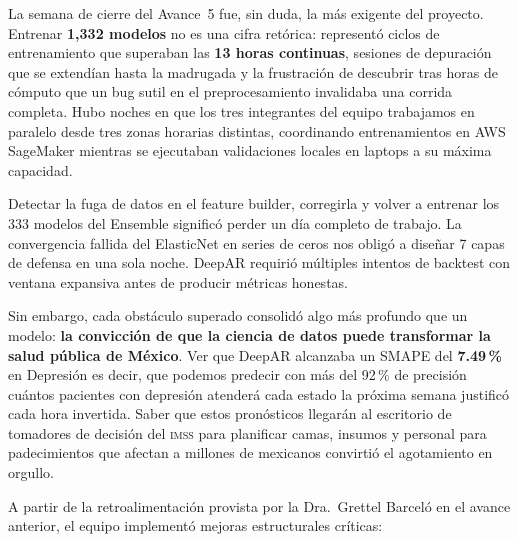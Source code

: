 \documentclass[12pt, letterpaper]{article}
\newcommand{\imss}{\textsc{imss}}
\begin{document}
\begin{insightbox}
La semana de cierre del Avance~5 fue, sin duda, la más exigente del proyecto. Entrenar \textbf{1,332 modelos} no es una cifra retórica: representó ciclos de entrenamiento que superaban las \textbf{13 horas continuas}, sesiones de depuración que se extendían hasta la madrugada y la frustración de descubrir tras horas de cómputo que un bug sutil en el preprocesamiento invalidaba una corrida completa. Hubo noches en que los tres integrantes del equipo trabajamos en paralelo desde tres zonas horarias distintas, coordinando entrenamientos en AWS SageMaker mientras se ejecutaban validaciones locales en laptops a su máxima capacidad.

Detectar la fuga de datos en el feature builder, corregirla y volver a entrenar los 333 modelos del Ensemble significó perder un día completo de trabajo. La convergencia fallida del ElasticNet en series de ceros nos obligó a diseñar 7 capas de defensa en una sola noche. DeepAR requirió múltiples intentos de backtest con ventana expansiva antes de producir métricas honestas.

Sin embargo, cada obstáculo superado consolidó algo más profundo que un modelo: \textbf{la convicción de que la ciencia de datos puede transformar la salud pública de México}. Ver que DeepAR alcanzaba un SMAPE del \textbf{7.49\,\%} en Depresión es decir, que podemos predecir con más del 92\,\% de precisión cuántos pacientes con depresión atenderá cada estado la próxima semana justificó cada hora invertida. Saber que estos pronósticos llegarán al escritorio de tomadores de decisión del \imss{} para planificar camas, insumos y personal para padecimientos que afectan a millones de mexicanos convirtió el agotamiento en orgullo.
\end{insightbox}

A partir de la retroalimentación provista por la Dra.\ Grettel Barceló en el avance anterior, el equipo implementó mejoras estructurales críticas:
\end{document}
